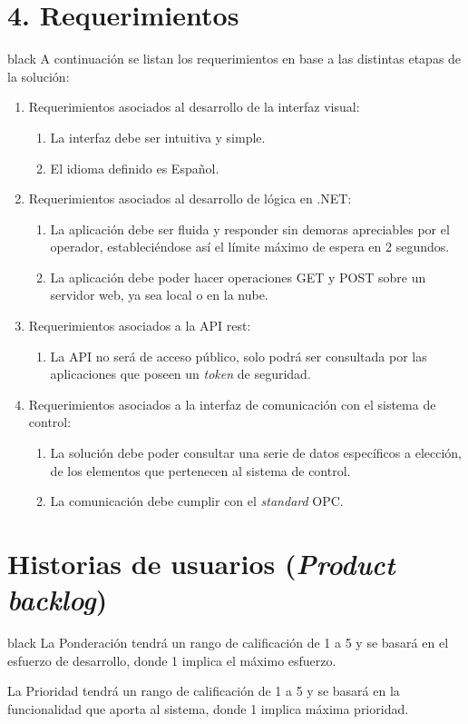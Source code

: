 \documentclass[11pt]{charter}
\begin{document}
\section{4. Requerimientos}
\label{sec:requerimientos}

\begin{consigna}{black}
A continuación se listan los requerimientos en base a las distintas etapas de la solución:

\begin{enumerate}
\item Requerimientos asociados al desarrollo de la interfaz visual:
	\begin{enumerate}
	\item La interfaz debe ser intuitiva y simple.
	\item El idioma definido es Español.
	\end{enumerate}
\item Requerimientos asociados al desarrollo de lógica en .NET:
	\begin{enumerate}
	\item La aplicación debe ser fluida y responder sin demoras apreciables por el operador, estableciéndose así el límite máximo de espera en 2 segundos.
	\item La aplicación debe poder hacer operaciones GET y POST sobre un servidor web, ya sea local o en la nube.
	\end{enumerate}
\item Requerimientos asociados a la API rest:
	\begin{enumerate}
	\item La API no será de acceso público, solo podrá ser consultada por las aplicaciones que poseen un \textit{token} de seguridad.
	\end{enumerate}
\item Requerimientos asociados a la interfaz de comunicación con el sistema de control:	
	\begin{enumerate}	
	\item La solución debe poder consultar una serie de datos específicos a elección, de los elementos que pertenecen al sistema de control.
	\item La comunicación debe cumplir con el \textit{standard} OPC.
	\end{enumerate}
\end{enumerate}

\end{consigna}

\section{Historias de usuarios (\textit{Product backlog})}
\label{sec:backlog}
\begin{consigna}{black}
La Ponderación tendrá un rango de calificación de 1 a 5 y se basará en el esfuerzo de desarrollo, donde 1 implica el máximo esfuerzo.

La Prioridad tendrá un rango de calificación de 1 a 5 y se basará en la funcionalidad que aporta al sistema, donde 1 implica máxima prioridad.
\end{consigna}
\end{document}
